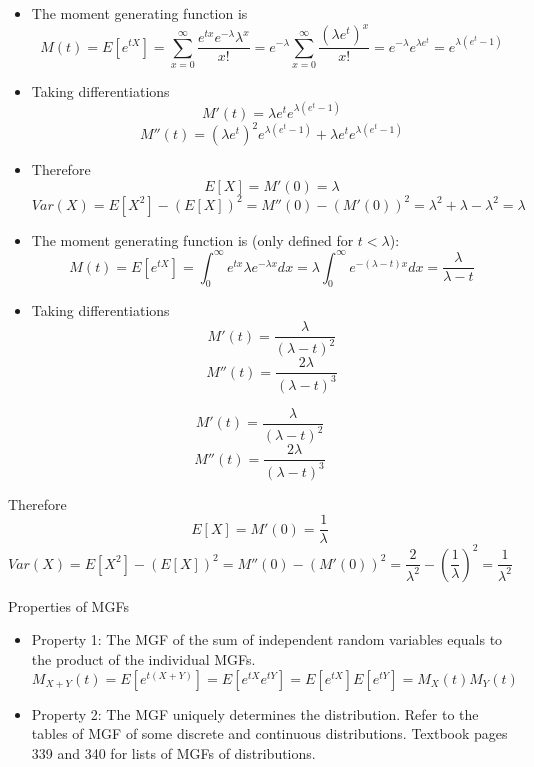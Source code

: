 \documentclass[slidestop,compress,mathserif]{beamer}
\begin{document}
\begin{frame}
\pause
{\small{
\begin{itemize}
\item The moment generating function is
$$M(t) = E[e^{tX}] = \sum_{x=0}^{\infty}\frac{e^{tx}e^{-\lambda}\lambda^x}{x!} = e^{-\lambda}\sum_{x=0}^{\infty}\frac{(\lambda e^{t})^x}{x!} = e^{-\lambda}e^{\lambda e^t} = e^{\lambda(e^t-1)}$$
\pause
\item Taking differentiations
$$M'(t) = \lambda e^te^{\lambda(e^t-1)}$$
\pause
$$M''(t) = (\lambda e^t)^2e^{\lambda(e^t-1)} + \lambda e^te^{\lambda(e^t-1)}$$
\pause
\item Therefore
$$E[X] = M'(0) = \lambda$$
\pause
$$Var(X) = E[X^2] - (E[X])^2 = M''(0) - (M'(0))^2 = \lambda^2 + \lambda - \lambda^2 = \lambda$$
\end{itemize}
}}
\end{frame}

\begin{frame}
\pause
{\small{
\begin{itemize}
\item The moment generating function is (only defined for $t < \lambda$):
$$M(t) = E[e^{tX}] =\int_{0}^{\infty} e^{tx}\lambda e^{-\lambda x}dx = \lambda \int_{0}^{\infty} e^{-(\lambda - t)x} dx = \frac{\lambda}{\lambda - t}$$
\pause
\item Taking differentiations
$$M'(t) = \frac{\lambda}{(\lambda - t)^2}$$
\pause
$$M''(t) = \frac{2\lambda}{(\lambda - t)^3}$$

\end{itemize}
}}
\end{frame}

\begin{frame}
$$M'(t) = \frac{\lambda}{(\lambda - t)^2}$$
$$M''(t) = \frac{2\lambda}{(\lambda - t)^3}$$


Therefore
$$E[X] = M'(0) = \frac{1}{\lambda}$$
\pause
$$Var(X) = E[X^2] - (E[X])^2 = M''(0) - (M'(0))^2 =\frac{2}{\lambda^2} - \left(\frac{1}{\lambda}\right)^2 = \frac{1}{\lambda^2}$$
\end{frame}

\begin{frame}{Properties of MGFs}
\begin{itemize}
\item Property 1: The MGF of the sum of independent random variables equals to the product of the individual MGFs.
$$M_{X+Y}(t) = E[e^{t(X+Y)}] = E[e^{tX}e^{tY}] = E[e^{tX}]E[e^{tY}] = M_X(t)M_Y(t)$$

\item Property 2: The MGF uniquely determines the distribution. Refer to the tables of MGF of some discrete and continuous distributions. {\color{red} Textbook pages 339 and 340 for lists of MGFs of distributions.}
\end{itemize}
\end{frame}
\end{document}
